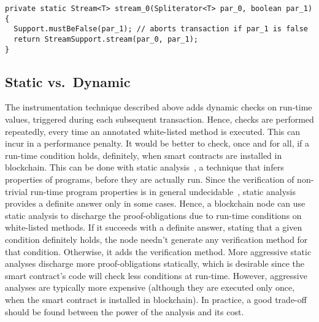 {\small\begin{verbatim}
private static Stream<T> stream_0(Spliterator<T> par_0, boolean par_1) {
  Support.mustBeFalse(par_1); // aborts transaction if par_1 is false
  return StreamSupport.stream(par_0, par_1);
}
\end{verbatim}}




\subsection{Static vs.\ Dynamic}\label{subsec:static_vs_dynamic}

The instrumentation technique described above adds dynamic checks on run-time values,
triggered during each subsequent transaction.
Hence, checks are performed repeatedly, every time an annotated white-listed method
is executed. This can incur in a performance penalty. It would be better
to check, once and for all,
if a run-time condition holds, definitely, when smart contracts
are installed in blockchain.
This can be done with static analysis~\cite{NielsonNH99}, a technique that infers
properties of programs, before they are actually run. Since the verification of
non-trivial run-time program properties is in general undecidable~\cite{Rice53},
static analysis provides a definite answer
only in some cases. Hence, a blockchain node can use static analysis to discharge
the proof-obligations due to run-time conditions on white-listed methods. If it
succeeds with a definite answer, stating that a given condition definitely holds,
the node needn't generate any verification method for that condition. Otherwise, it
adds the verification method.
%
More aggressive static analyses discharge more proof-obligations statically,
which is desirable since the smart contract's code will check less
conditions at run-time. However, aggressive analyses are typically more expensive
(although they are executed only once, when the smart contract is installed in
blockchain). In practice, a good trade-off should be found between the power of the analysis
and its cost.

